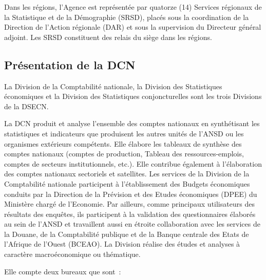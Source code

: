 \documentclass[12pt,a4paper,oneside]{report}
\begin{document}
Dans les régions, l’Agence est représentée par quatorze (14) Services régionaux de la Statistique et de la
Démographie (SRSD), placés sous la coordination de la Direction de l’Action régionale (DAR) et sous la
supervision du Directeur général adjoint. Les SRSD constituent des relais du siège dans les régions.

\subsection{Présentation de la DCN}

La Division de la Comptabilité nationale, la Division des Statistiques économiques et la Division des
Statistiques conjoncturelles sont les trois Divisions de la DSECN.

La DCN produit et analyse l'ensemble des comptes nationaux en synthétisant les statistiques et indicateurs que
produisent les autres unités de l'ANSD ou les organismes extérieurs compétents. Elle élabore les tableaux de
synthèse des comptes nationaux (comptes de production, Tableau des ressources-emplois, comptes de secteurs
institutionnels, etc.). Elle contribue également à l'élaboration des comptes nationaux sectoriels et
satellites. Les services de la Division de la Comptabilité nationale participent à l’établissement des Budgets
économiques conduits par la Direction de la Prévision et des Etudes économiques (DPEE) du Ministère chargé de
l’Economie. Par ailleurs, comme principaux utilisateurs des résultats des enquêtes, ils participent à la
validation des questionnaires élaborés au sein de l’ANSD et travaillent aussi en étroite collaboration avec
les services de la Douane, de la Comptabilité publique et de la Banque centrale des Etats de l’Afrique de
l’Ouest (BCEAO). La Division réalise des études et analyses à caractère macroéconomique ou thématique.

Elle compte deux bureaux que sont~:
\end{document}
